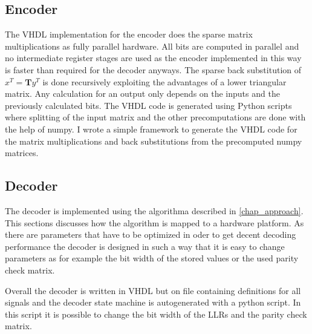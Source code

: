 \subsection{Encoder}
The VHDL implementation for the encoder does the sparse matrix multiplications as fully parallel hardware. All bits are computed in parallel and no intermediate register stages are used as the encoder implemented in this way is faster than required for the decoder anyways. The sparse back substitution of $x^T = \bm{T}y^T$ is done recursively exploiting the advantages of a lower triangular matrix. Any calculation for an output only depends on the inputs and the previously calculated bits. The VHDL code is generated using Python scripts where splitting of the input matrix and the other precomputations are done with the help of numpy. I wrote a simple framework to generate the VHDL code for the matrix multiplications and back substitutions from the precomputed numpy matrices. 

\subsection{Decoder}
The decoder is implemented using the algorithma described in \cref{chap_approach}. This sections discusses how the algorithm is mapped to a hardware platform. As there are parameters that have to be optimized in oder to get decent decoding performance the decoder is designed in such a way that it is easy to change parameters as for example the bit width of the stored values or the used parity check matrix. 

Overall the decoder is written in VHDL but on file containing definitions for all signals and the decoder state machine is autogenerated with a python script. In this script it is possible to change the bit width of the LLRs and the parity check matrix.

